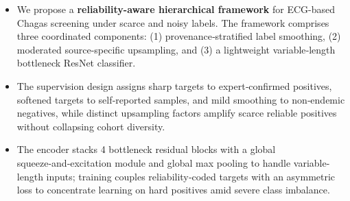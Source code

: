 \documentclass[a0paper,portrait]{baposter}
\begin{document}
\begin{poster}
{\begin{itemize}
\item We propose a \textbf{reliability-aware hierarchical framework} for ECG-based Chagas screening under scarce and noisy labels. The framework comprises three coordinated components: (1) provenance‑stratified label smoothing, (2) moderated source-specific upsampling, and (3) a lightweight variable‑length bottleneck ResNet classifier.
\item The supervision design assigns sharp targets to expert‑confirmed positives, softened targets to self‑reported samples, and mild smoothing to non‑endemic negatives, while distinct upsampling factors amplify scarce reliable positives without collapsing cohort diversity.
\item The encoder stacks 4 bottleneck residual blocks with a global squeeze‑and‑excitation module and global max pooling to handle variable-length inputs; training couples reliability‑coded targets with an asymmetric loss to concentrate learning on hard positives amid severe class imbalance.
\end{itemize}
}





\end{poster}
\end{document}
